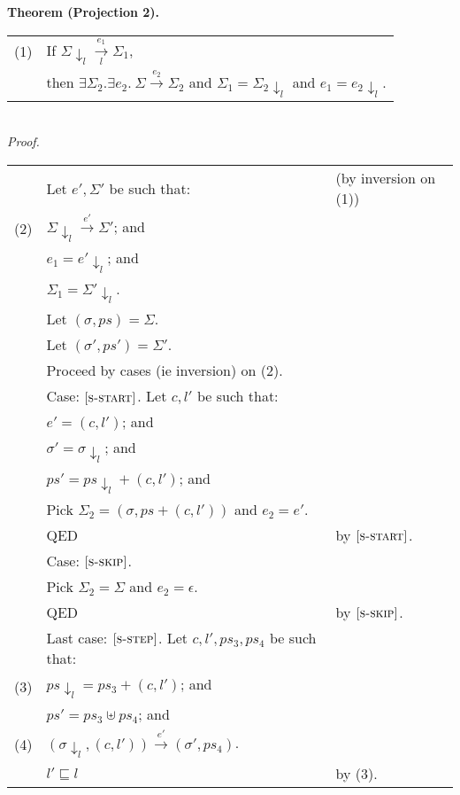 \documentclass{article}
\newcommand{\rn}[1]{\text{\textsc{[#1]}}}
\newcommand{\tsteparrow}[1]{\overset{#1}{\longrightarrow}}
\newcommand{\tstep}[3]{#2\tsteparrow{#1}#3}
\newcommand{\ssteparrow}[1]{\overset{#1}{\longrightarrow}}
\newcommand{\sstep}[3]{#2\ssteparrow{#1}#3}
\newcommand{\lssteparrow}[2]{\overset{#2}{\underset{#1}{\longrightarrow}}}
\newcommand{\lsstep}[4]{#3\lssteparrow{#1}{#2}#4}
\newcommand{\process}[2]{(#1,#2)}
\newcommand{\proj}[2]{#1{\downarrow_{#2}}}
\begin{document}
\newpage
\noindent
%
%
\textbf{Theorem (Projection 2).}
\\
\begin{tabular}{l@{$\qquad$}l}
  (1) & If $\lsstep{l}{e_1}{\proj{\Sigma}{l}}{\Sigma_1}$,
\\
      & then $\exists \Sigma_2.\exists e_2.~\sstep{e_2}{\Sigma}{\Sigma_2}$
        and $\Sigma_1 = \proj{\Sigma_2}{l}$
        and $e_1 = \proj{e_2}{l}$.
\end{tabular}
\\
\textit{Proof.}
\\
\begin{tabular}{l@{$\qquad$}l@{\qquad}l}
        & Let $e',\Sigma'$ be such that:
        & (by inversion on (1))
\\
  (2)   & $\sstep{e'}{\proj{\Sigma}{l}}{\Sigma'}$; and
\\
        & $e_1=\proj{e'}{l}$; and
\\
        & $\Sigma_1=\proj{\Sigma'}{l}$.
\\
        & Let $(\sigma,ps)=\Sigma$.
\\
        & Let $(\sigma',ps')=\Sigma'$.
\\
        & Proceed by cases (ie inversion) on (2).
\\
        & Case: $\rn{s-start}$. Let $c,l'$ be such that:
\\
        & \z $e'=\process{c}{l'}$; and
\\
        & \z $\sigma'=\proj{\sigma}{l}$; and
\\
        & \z $ps'=\proj{ps}{l}+\process{c}{l'}$; and
\\
        & \z Pick $\Sigma_2 = (\sigma,ps+\process{c}{l'})$ and $e_2=e'$.
\\
        & \z QED
        & by $\rn{s-start}$.
\\
        & Case: $\rn{s-skip}$.
\\
        & \z Pick $\Sigma_2=\Sigma$ and $e_2=\epsilon$.
\\
        & \z QED
        & by $\rn{s-skip}$.
\\
        & Last case: $\rn{s-step}$. Let $c,l',ps_3,ps_4$ be such that:
\\
  (3)   & $\proj{ps}{l}=ps_3+\process{c}{l'}$; and
\\
        & $ps'=ps_3\uplus ps_4$; and
\\
  (4)   & $\tstep{e'}{(\proj{\sigma}{l},\process{c}{l'})}{(\sigma',ps_4)}$.
\\
        & $l'\sqsubseteq l$
        & by (3).
\\

\end{tabular}
\end{document}
